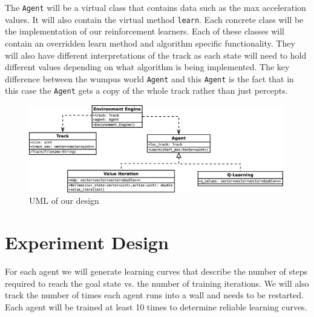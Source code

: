 \documentclass{article}
\begin{document}
	The \texttt{Agent} will be a virtual class that contains data such as the max acceleration values. It will also contain the virtual method \texttt{learn}. Each concrete class will be the implementation of our reinforcement learners. Each of these classes will contain an overridden learn method and algorithm specific functionality. They will also have different interpretations of the track as each state will need to hold different values depending on what algorithm is being implemented. The key difference between the wumpus world \texttt{Agent} and this \texttt{Agent} is the fact that in this case the \texttt{Agent} gets a copy of the whole track rather than just percepts.
	\begin{figure}


		\centering
		\includegraphics[width=0.99\textwidth]{Diagrams/uml}
		\caption{UML of our design}
	\end{figure}
	\section{Experiment Design}
		 For each agent we will generate learning curves that describe the number of steps required to reach the goal state vs. the number of training iterations. We will also track the number of times each agent runs into a wall and needs to be restarted. Each agent will be trained at least 10 times to determine reliable learning curves.

		
	
\end{document}

